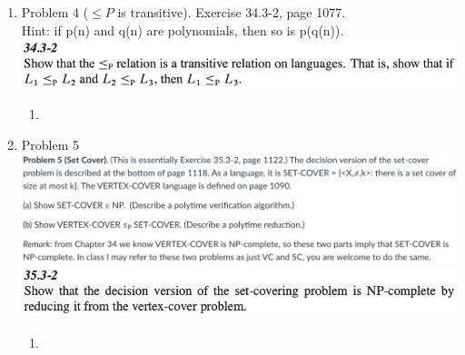\documentclass[11pt]{article}
\begin{document}
\begin{enumerate}
\begin{enumerate}
    \end{enumerate}

\pagebreak

\item Problem 4 ($\leq P$ is transitive). Exercise 34.3-2, page 1077. \\Hint: if p(n) and q(n) are polynomials, then so is p(q(n)).\\
\includegraphics[scale=1]{HW5_Q4.png}
    \begin{enumerate}
        \item 
    \end{enumerate}

\pagebreak
\item Problem 5\\
\includegraphics[scale=0.55]{HW5_Q5_1.png}\\
\includegraphics[scale=1]{HW5_Q5_2.png}
    \begin{enumerate}
        \item 
    
    \end{enumerate}
    
\end{enumerate}
\pagebreak
\end{document}

